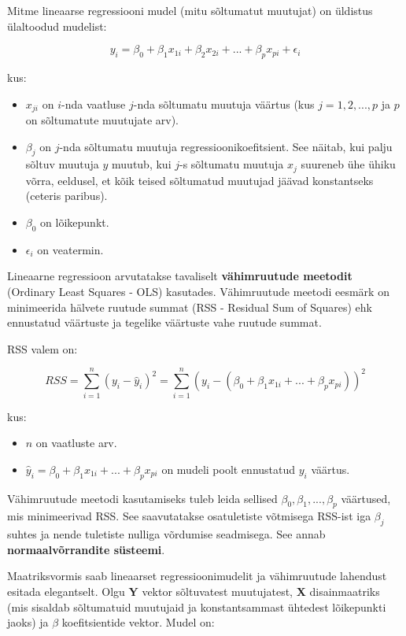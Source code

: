 \documentclass[
]{book}
\providecommand{\tightlist}{%
  \setlength{\itemsep}{0pt}\setlength{\parskip}{0pt}}
\begin{document}
Mitme lineaarse regressiooni mudel (mitu sõltumatut muutujat) on üldistus ülaltoodud mudelist:

\[y_i = \beta_0 + \beta_1 x_{1i} + \beta_2 x_{2i} + ... + \beta_p x_{pi} + \epsilon_i\]

kus:

\begin{itemize}
\tightlist
\item
  \(x_{ji}\) on \(i\)-nda vaatluse \(j\)-nda sõltumatu muutuja väärtus (kus \(j=1, 2, ..., p\) ja \(p\) on sõltumatute muutujate arv).
\item
  \(\beta_j\) on \(j\)-nda sõltumatu muutuja regressioonikoefitsient. See näitab, kui palju sõltuv muutuja \(y\) muutub, kui \(j\)-s sõltumatu muutuja \(x_j\) suureneb ühe ühiku võrra, eeldusel, et kõik teised sõltumatud muutujad jäävad konstantseks (ceteris paribus).
\item
  \(\beta_0\) on lõikepunkt.
\item
  \(\epsilon_i\) on veatermin.
\end{itemize}

Lineaarne regressioon arvutatakse tavaliselt \textbf{vähimruutude meetodit} (Ordinary Least Squares - OLS) kasutades. Vähimruutude meetodi eesmärk on minimeerida hälvete ruutude summat (RSS - Residual Sum of Squares) ehk ennustatud väärtuste ja tegelike väärtuste vahe ruutude summat.

RSS valem on:

\[RSS = \sum_{i=1}^{n} (y_i - \hat{y}_i)^2 = \sum_{i=1}^{n} (y_i - (\beta_0 + \beta_1 x_{1i} + ... + \beta_p x_{pi}))^2\]

kus:

\begin{itemize}
\tightlist
\item
  \(n\) on vaatluste arv.
\item
  \(\hat{y}_i = \beta_0 + \beta_1 x_{1i} + ... + \beta_p x_{pi}\) on mudeli poolt ennustatud \(y_i\) väärtus.
\end{itemize}

Vähimruutude meetodi kasutamiseks tuleb leida sellised \(\beta_0, \beta_1, ..., \beta_p\) väärtused, mis minimeerivad RSS. See saavutatakse osatuletiste võtmisega RSS-ist iga \(\beta_j\) suhtes ja nende tuletiste nulliga võrdumise seadmisega. See annab \textbf{normaalvõrrandite süsteemi}.

Maatriksvormis saab lineaarset regressioonimudelit ja vähimruutude lahendust esitada elegantselt. Olgu \textbf{Y} vektor sõltuvatest muutujatest, \textbf{X} disainmaatriks (mis sisaldab sõltumatuid muutujaid ja konstantsammast ühtedest lõikepunkti jaoks) ja \textbf{\(\beta\)} koefitsientide vektor. Mudel on:
\end{document}
